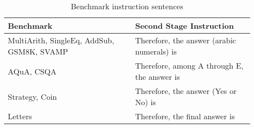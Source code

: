 \begin{table}[htbp]
    \centering
    \renewcommand{\arraystretch}{1.2} %
    \begin{tabular}{m{3cm}|m{4cm}} %
        \toprule
        \textbf{Benchmark} & \textbf{Second Stage Instruction} \\
        \midrule
        MultiArith, SingleEq, AddSub, GSM8K, SVAMP & Therefore, the answer (arabic numerals) is \\
        \midrule
        AQuA, CSQA & Therefore, among A through E, the answer is \\
        \midrule
        Strategy, Coin & Therefore, the answer (Yes or No) is \\
        \midrule
        Letters & Therefore, the final answer is \\
        \bottomrule
    \end{tabular}
    \caption{Benchmark instruction sentences}
    \label{tab:benchmarkinstruction}
\end{table}